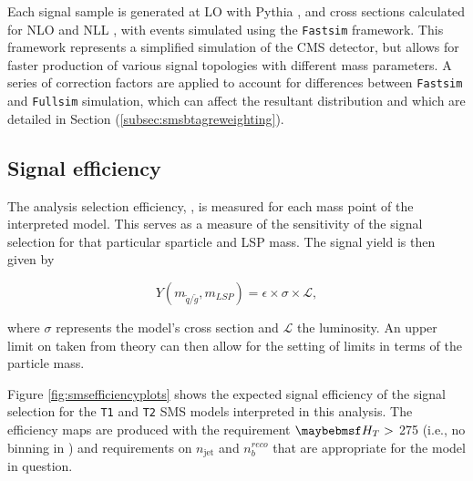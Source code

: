Each signal sample is generated at \acf{LO} with Pythia \cite{Sjostrand:2006za}, and cross sections calculated for \acf{NLO} and \acf{NLL} \cite{Beenakker:1996ch}, with events simulated using the \texttt{Fastsim} framework. This framework represents a simplified simulation of the \ac{CMS} detector, but allows for faster production of various signal topologies with different mass parameters. A series of correction factors are applied to account for differences between \texttt{Fastsim} \cite{1742-6596-331-3-032049} and \texttt{Fullsim} \cite{1742-6596-331-3-032015} simulation, which can affect the resultant \nbreco distribution and which are detailed in Section (\ref{subsec:smsbtagreweighting}). 

\subsection{Signal efficiency}

The analysis selection efficiency, \epsilon, is measured for each mass point of the interpreted model. This serves as a measure of the sensitivity of the signal selection for that particular sparticle and \ac{LSP} mass. The signal yield is then given by

\begin{equation}
Y(m_{\widetilde{q}/\widetilde{g}},m_{LSP}) = \epsilon \times \sigma \times \mathcal{L},
\end{equation}

where $\sigma$ represents the model's cross section and $\mathcal{L}$ the luminosity. An upper limit on \sigma taken from theory can then allow for the setting of limits in terms of the particle mass. 

Figure \ref{fig:smsefficiencyplots} shows the expected signal efficiency of the signal selection for the \texttt{T1} and \texttt{T2} \ac{SMS} models interpreted in this analysis. The efficiency maps are produced with the requirement $\theht >$ 275 \GeV (i.e., no binning in \theht) and requirements on $n_{\text{jet}}$ and $n_{b}^{reco}$ that are appropriate for the model in question.


